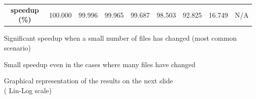 \documentclass{beamer}
\begin{document}
\begin{tframe}
{\begin{table}
\begin{adjustbox}{max width=\textwidth, center}
\begin{tabular}{c|*{7}{c|}c}
              \multicolumn{1}{|c|}{\textbf{speedup (\%)}} & 100.000 & 99.996 & 99.965 & 99.687 & 98.503 & 92.825 & 16.749 & \multicolumn{1}{|c|}{N/A} \\ \cline{1-9}
            \end{tabular}
          \end{adjustbox}
        \end{table}
        \begin{adv}
          \item Significant speedup when a small number of files has changed (most common scenario)
          \item Small speedup even in the cases where many files have changed
        \end{adv}
        Graphical representation of the results on the next slide\\
        ( Lin-Log scale)
      }
  	\end{tframe}
\end{document}
